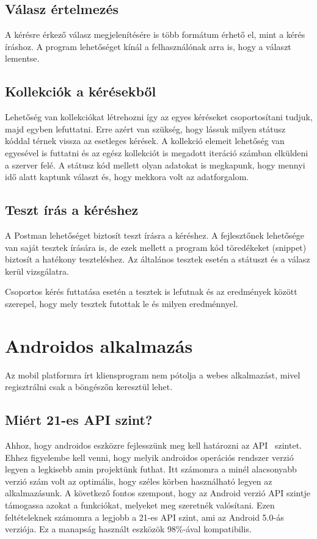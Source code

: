 \documentclass[
]{thesis-ekf}
\theoremstyle{definition}
\theoremstyle{remark}
\begin{document}
	\section{Válasz értelmezés}
	A kérésre érkező válasz megjelenítésére is több formátum érhető el, mint a kérés íráshoz. A program lehetőséget kínál a felhasználónak arra is, hogy a választ lementse.
	
	\section{Kollekciók a kérésekből}
	Lehetőség van kollekciókat létrehozni így az egyes kéréseket csoportosítani tudjuk, majd egyben lefuttatni. Erre azért van szükség, hogy lássuk milyen státusz kóddal térnek vissza az esetleges kérések. A kollekció elemeit lehetőség van egyesével is futtatni és az egész kollekciót is megadott iteráció számban elküldeni a szerver felé. A státusz kód mellett olyan adatokat is megkapunk, hogy mennyi idő alatt kaptunk választ és, hogy mekkora volt az adatforgalom. 
	
	\section{Teszt írás a kéréshez}
	A Postman lehetőséget biztosít teszt írásra a kéréshez. A fejlesztőnek lehetősége van saját tesztek írására is, de ezek mellett a program kód töredékeket (snippet) biztosít a hatékony teszteléshez. Az általános tesztek esetén a státuszt és a válasz kerül vizsgálatra.
	
	Csoportos kérés futtatása esetén a tesztek is lefutnak és az eredmények között szerepel, hogy mely tesztek futottak le és milyen eredménnyel. 
	
	\chapter{Androidos alkalmazás}
	Az mobil platformra írt kliensprogram nem pótolja a webes alkalmazást, mivel regisztrálni csak a böngészőn keresztül lehet. 
	\section{Miért 21-es API szint?}
	Ahhoz, hogy androidos eszközre fejlesszünk meg kell határozni az API~\cite{android_api_level} szintet. Ehhez figyelembe kell venni, hogy melyik androidos operációs rendszer verzió legyen a legkisebb amin projektünk futhat. Itt számomra a minél alacsonyabb verzió szám volt az optimális, hogy széles körben használható legyen az alkalmazásunk. A következő fontos szempont, hogy az Android verzió API szintje támogassa azokat a funkciókat, melyeket meg szeretnék valósítani. Ezen feltételeknek számomra a legjobb a 21-es API szint, ami az Android 5.0-ás verziója. Ez a manapság használt eszközök 98\%-ával kompatibilis.
	
\end{document}

